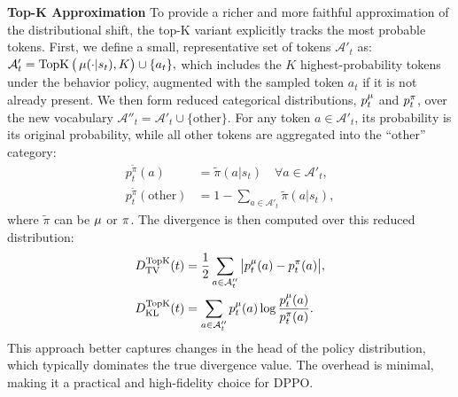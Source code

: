 \textbf{Top-K Approximation}  
\label{sec:method_topk}  
To provide a richer and more faithful approximation of the distributional shift, the top-K variant explicitly tracks the most probable tokens. First, we define a small, representative set of tokens $\mathcal{A}'_t$ as:  
$ \mathcal{A}'_t = \operatorname{TopK}\big(\operatorname*{{\textcolor{black}{\mu}}}(\cdot | s_t), K\big) \cup \{a_t\},  $
which includes the $K$ highest-probability tokens under the behavior policy, augmented with the sampled token $a_t$ if it is not already present. We then form reduced categorical distributions, $p^{\operatorname*{{\textcolor{black}{\mu}}}}_t$ and $p^{\operatorname*{{\textcolor{black}{\pi}}}}_t$, over the new vocabulary $\mathcal{A}''_t = \mathcal{A}'_t \cup \{\text{other}\}$. For any token $a \in \mathcal{A}'_t$, its probability is its original probability, while all other tokens are aggregated into the ``other'' category:  
\begin{align*}  
p^{\tilde{\pi}}_t(a) &= \tilde{\pi}(a | s_t) \quad \forall a \in \mathcal{A}'_t, \\  
p^{\tilde{\pi}}_t(\text{other}) &= 1 - \sum_{a \in \mathcal{A}'_t} \tilde{\pi}(a | s_t),  
\end{align*}  
where $\tilde{\pi}$ can be $\operatorname*{{\textcolor{black}{\mu}}}$ or $\operatorname*{{\textcolor{black}{\pi}}}$. The divergence is then computed over this reduced distribution: 
\begin{align}  
D_{\mathrm{TV}}^{\mathrm{TopK}}(t) &= \frac{1}{2} \sum_{a \in \mathcal{A}''_t} \big| p^{\operatorname*{{\textcolor{black}{\mu}}}}_t(a) - p^{\operatorname*{{\textcolor{black}{\pi}}}}_t(a) \big|, 
\label{eq:topk_tv}
\\  
D_{\mathrm{KL}}^{\mathrm{TopK}}(t) &= \sum_{a \in \mathcal{A}''_t} p^{\operatorname*{{\textcolor{black}{\mu}}}}_t(a) \log \frac{p^{\operatorname*{{\textcolor{black}{\mu}}}}_t(a)}{p^{\operatorname*{{\textcolor{black}{\pi}}}}_t(a)}.
\label{eq:topk_kl}
\end{align}  
This approach better captures changes in the head of the policy distribution, which typically dominates the true divergence value. The overhead is minimal, making it a practical and high-fidelity choice for DPPO.

